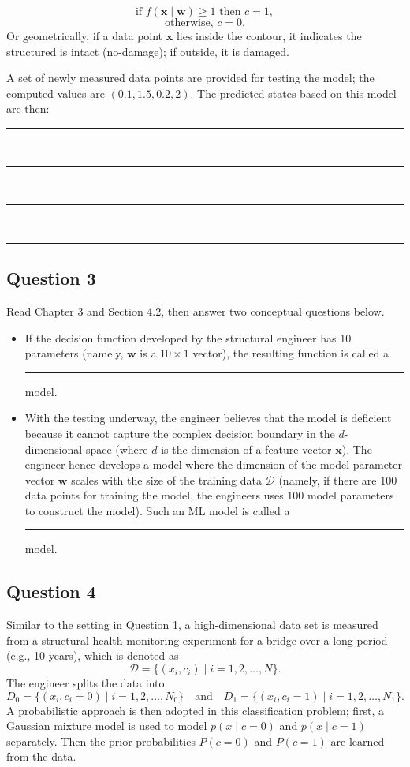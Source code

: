 \documentclass[12pt]{article}
\begin{document}
\[
\text{if } f(\bm{x}\mid \bm{w}) \geq 1 \text{ then } c = 1,
\]
\[
\text{otherwise, } c = 0.
\]
Or geometrically, if a data point $\bm{x}$ lies inside the contour, it indicates the structured is intact (no-damage); if outside, it is damaged. 

A set of newly measured data points are provided for testing the model; the computed values are \((0.1, 1.5, 0.2, 2)\). The predicted states based on this model are then:\\
\rule{1in}{0.15mm}\\
\rule{1in}{0.15mm}\\
\rule{1in}{0.15mm}\\
\rule{1in}{0.15mm}

\bigskip

\subsection*{Question 3} 
Read Chapter 3 and Section 4.2, then answer two conceptual questions below. 
\begin{itemize}

    \item If the decision function developed by the structural engineer has 10 parameters (namely, $\bm{w}$ is a $10\times 1$ vector), the resulting function is called a {\rule{1in}{0.15mm}} model. 


    \item With the testing underway, the engineer believes that the model is deficient because it cannot capture the complex decision boundary in the \(d\)-dimensional space (where \(d\) is the dimension of a feature vector \(\bm{x}\)). The engineer hence develops a model where the dimension of the model parameter vector $\bm{w}$ scales with the size of the training data $\mathcal{D}$ (namely, if there are 100 data points for training the model, the engineers uses 100 model parameters to construct the model). Such an ML model is called a {\rule{1in}{0.15mm}} model.
    \end{itemize}
\bigskip

\subsection*{Question 4} 

Similar to the setting in Question 1, a high-dimensional data set is measured from a structural health monitoring experiment for a bridge over a long period (e.g., 10 years), which is denoted as
\[
\mathcal{D} = \{(x_i, c_i) \mid i = 1, 2, \ldots, N\}.
\]
The engineer splits the data into
\[
D_0 = \{(x_i, c_i = 0) \mid i = 1, 2, \ldots, N_0\} \quad \text{and} \quad D_1 = \{(x_i, c_i = 1) \mid i = 1, 2, \ldots, N_1\}.
\]
A probabilistic approach is then adopted in this classification problem; first, a Gaussian mixture model is used to model \(p(x\mid c=0)\) and \(p(x\mid c=1)\) separately. Then the prior probabilities \(P(c=0)\) and \(P(c=1)\) are learned from the data.
\end{document}
